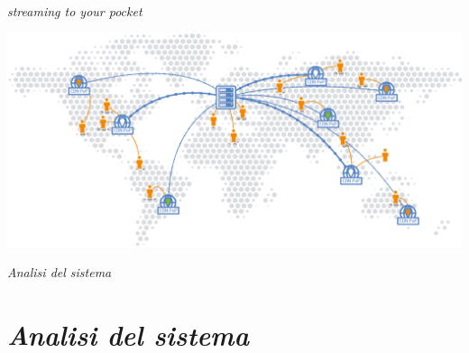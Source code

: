 \documentclass{article}
\author{Agosta, Belli, Emili, Giacchini, Luciani}
\begin{document}
\begin{center}
    \sffamily{\fontsize{50}{48} \selectfont \textcolor{red}{Nexi}\textcolor{green}{Fy}}
\end{center}

\begin{center}
    \itshape{\fontsize{20}{48} \selectfont streaming to your pocket}
\end{center}

\bigskip\bigskip\bigskip

\begin{flushleft}
    \includegraphics[scale=1]{../images/worldCDN.png}
\end{flushleft}

\bigskip\bigskip\bigskip

\begin{center}
    \itshape{\fontsize{30}{48} \selectfont Analisi del sistema}
\end{center}

\newpage
\printindex

\newpage
\section{\itshape{Analisi del sistema}}

\end{document}
